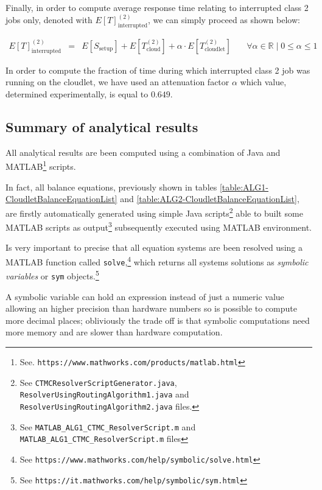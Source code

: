 \documentclass[10pt,a4paper]{article}
\begin{document}
Finally, in order to compute average response time relating to interrupted class 2 jobs only, denoted with $E[T]^{(2)}_{\text{interrupted}}$, we can simply proceed as shown below:

\begin{equation}
\begin{array} {lcll} 
E[T]^{(2)}_{\text{interrupted}}  & = & E[S_{\text{setup}}] + E[T_{\text{cloud}}^{(2)}] + \alpha \cdot E[T_{\text{cloudlet}}^{(2)}] & \quad \forall \alpha \in \mathbb{R} \mid 0 \leq \alpha \leq 1
\end{array}
\end{equation}

In order to compute the fraction of time during which interrupted class 2 job was running on the cloudlet, we have used an attenuation factor $\alpha$ which value, determined experimentally, is equal to $0.649$.


\newpage
\subsection{Summary of analytical results}


All analytical results are been computed using a combination of Java and MATLAB\footnote{See. \texttt{https://www.mathworks.com/products/matlab.html}} scripts.

In fact, all balance equations, previously shown in tables \ref{table:ALG1-CloudletBalanceEquationList} and \ref{table:ALG2-CloudletBalanceEquationList}, are firstly automatically generated using simple Java scripts\footnote{See \texttt{CTMCResolverScriptGenerator.java}, \texttt{ResolverUsingRoutingAlgorithm1.java} and \texttt{ResolverUsingRoutingAlgorithm2.java} files.} able to built some MATLAB scripts as output\footnote{See \texttt{MATLAB\_ALG1\_CTMC\_ResolverScript.m} and \texttt{MATLAB\_ALG1\_CTMC\_ResolverScript.m} files} subsequently executed using MATLAB environment.

Is very important to precise that all equation systems are been resolved using a MATLAB function called \texttt{solve},\footnote{See \texttt{https://www.mathworks.com/help/symbolic/solve.html}} which returns all systems solutions as \textit{symbolic variables} or \texttt{sym} objects.\footnote{See \texttt{https://it.mathworks.com/help/symbolic/sym.html}} 

A symbolic variable can hold an expression instead of just a numeric value allowing an higher precision than hardware numbers so is possible to compute more decimal places; obliviously the trade off is that symbolic computations need more memory and are slower than hardware computation. 
\end{document}

